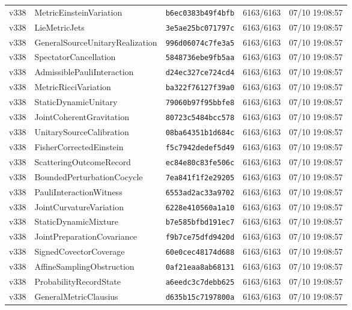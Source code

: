 \documentclass[11pt]{article}
\theoremstyle{definition}\newtheorem{deriv}{Derivação}
\begin{document}
{\begin{longtable}{@{}lllll@{}}
v338 & MetricEinsteinVariation & \texttt{b6ec0383b49f4bfb} & 6163/6163 & 07/10 19:08:57 \\
v338 & LieMetricJets & \texttt{3e5ae25bc071797c} & 6163/6163 & 07/10 19:08:57 \\
v338 & GeneralSourceUnitaryRealization & \texttt{996d06074c7fe3a5} & 6163/6163 & 07/10 19:08:57 \\
v338 & SpectatorCancellation & \texttt{5848736ebe9fb5aa} & 6163/6163 & 07/10 19:08:57 \\
v338 & AdmissiblePauliInteraction & \texttt{d24ec327ce724cd4} & 6163/6163 & 07/10 19:08:57 \\
v338 & MetricRicciVariation & \texttt{ba322f76127f39a0} & 6163/6163 & 07/10 19:08:57 \\
v338 & StaticDynamicUnitary & \texttt{79060b97f95bbfe8} & 6163/6163 & 07/10 19:08:57 \\
v338 & JointCoherentGravitation & \texttt{80723c5484bcc578} & 6163/6163 & 07/10 19:08:57 \\
v338 & UnitarySourceCalibration & \texttt{08ba64351b1d684c} & 6163/6163 & 07/10 19:08:57 \\
v338 & FisherCorrectedEinstein & \texttt{f5c7942dedef5d49} & 6163/6163 & 07/10 19:08:57 \\
v338 & ScatteringOutcomeRecord & \texttt{ec84e80c83fe506c} & 6163/6163 & 07/10 19:08:57 \\
v338 & BoundedPerturbationCocycle & \texttt{7ea841f1f2e29205} & 6163/6163 & 07/10 19:08:57 \\
v338 & PauliInteractionWitness & \texttt{6553ad2ac33a9702} & 6163/6163 & 07/10 19:08:57 \\
v338 & JointCurvatureVariation & \texttt{6228e410560a1a10} & 6163/6163 & 07/10 19:08:57 \\
v338 & StaticDynamicMixture & \texttt{b7e585bfbd191ec7} & 6163/6163 & 07/10 19:08:57 \\
v338 & JointPreparationCovariance & \texttt{f9b7ce75dfd9420d} & 6163/6163 & 07/10 19:08:57 \\
v338 & SignedCovectorCoverage & \texttt{60e0cec48174d688} & 6163/6163 & 07/10 19:08:57 \\
v338 & AffineSamplingObstruction & \texttt{0af21eaa8ab68131} & 6163/6163 & 07/10 19:08:57 \\
v338 & ProbabilityRecordState & \texttt{a6eedc3c7debb625} & 6163/6163 & 07/10 19:08:57 \\
v338 & GeneralMetricClausius & \texttt{d635b15c7197800a} & 6163/6163 & 07/10 19:08:57 \\

\end{longtable}}
\end{document}
